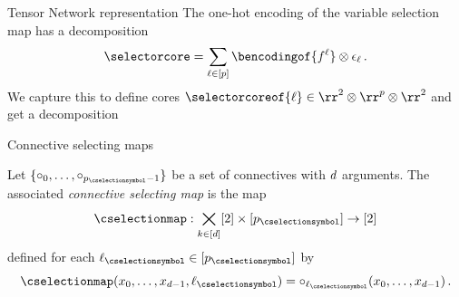 \documentclass{beamer}
\begin{document}
\begin{frame}{Tensor Network representation}
The one-hot encoding of the variable selection map has a decomposition 
\begin{align*}
	{\selectorcore} 
	= \sum_{\selindexin} \bencodingof{\atomicformulaof{\selindex}} \otimes  \onehotmapof{\selindex} \, .
\end{align*}
We capture this to define cores $\selectorcoreof{\selindex} \in \rr^{2}\otimes \rr^{\seldim} \otimes \rr^2$ and get a decomposition
\begin{center}
	
\end{center}
\end{frame}


\begin{frame}{Connective selecting maps}

\begin{definition}
	Let $\{\exconnective_{0},\ldots,\exconnective_{\seldimof{\cselectionsymbol}-1}\}$ be a set of connectives with $d$ arguments.
	The associated \emph{connective selecting map} is the map
		\[ \cselectionmap : \atomstates \times [\seldimof{\cselectionsymbol}] \rightarrow [2] \]
	defined for each $\selindexof{\cselectionsymbol}\in[\seldimof{\cselectionsymbol}]$ by
		\[ \cselectionmap(\atomindices,\selindexof{\cselectionsymbol}) = \exconnective_{\selindexof{\cselectionsymbol}}(\atomindices)  \, . \]
\end{definition}

\begin{center}
	
\end{center}


\end{frame}
\end{document}
